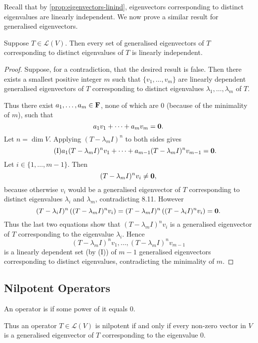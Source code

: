 Recall that by \ref{prop:eigenvectors-linind}, eigenvectors corresponding to distinct eigenvalues are linearly independent. 
We now prove a similar result for generalised eigenvectors.

\begin{proposition}
Suppose $T\in\mathcal{L}(V)$. Then every set of generalised eigenvectors of $T$ corresponding to distinct eigenvalues of $T$ is linearly independent.
\end{proposition}

\begin{proof}
Suppose, for a contradiction, that the desired result is false.
Then there exists a smallest positive integer $m$ such that $\{v_1,\dots,v_m\}$ are linearly dependent generalised eigenvectors of $T$ corresponding to distinct eigenvalues $\lambda_1,\dots,\lambda_m$ of $T$.

Thus there exist $a_1,\dots,a_m\in\mathbf F$, none of which are $0$ (because of the minimality of $m$), such that
\[a_1v_1+\cdots+a_mv_m=\vb{0}.\]
Let $n=\dim V$. Applying $(T-\lambda_m I)^n$ to both sides gives
\begin{equation*}\tag{I}
a_1(T-\lambda_m I)^n v_1+\cdots+a_{m-1}(T-\lambda_m I)^n v_{m-1}=\vb{0}.
\end{equation*}
Let $i\in\{1,\dots,m-1\}$. Then
\[(T-\lambda_m I)^n v_i\neq\vb{0},\]
because otherwise $v_i$ would be a generalised eigenvector of $T$ corresponding to distinct eigenvalues $\lambda_i$ and $\lambda_m$, contradicting 8.11.
However
\[(T-\lambda_i I)^n\left((T-\lambda_m I)^n v_i\right)=(T-\lambda_m I)^n\left((T-\lambda_i I)^n v_i\right)=\vb{0}.\]
Thus the last two equations show that $(T-\lambda_m I)^n v_i$ is a generalised eigenvector of $T$ corresponding to the eigenvalue $\lambda_i$. Hence
\[(T-\lambda_m I)^n v_1,\dots,(T-\lambda_m I)^n v_{m-1}\]
is a linearly dependent set (by (I)) of $m-1$ generalised eigenvectors corresponding to distinct eigenvalues, contradicting the minimality of $m$. 
\end{proof}

\subsection{Nilpotent Operators}
\begin{definition}
An operator is  if some power of it equals $0$.
\end{definition}

Thus an operator $T\in\mathcal{L}(V)$ is nilpotent if and only if every non-zero vector in $V$ is a generalised eigenvector of $T$ corresponding to the eigenvalue $0$.

